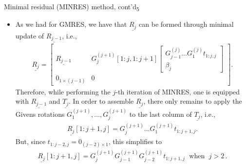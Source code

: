 \documentclass[t,usepdftitle=false]{beamer}
\begin{document}
\begin{frame}{Minimal residual (MINRES) method, cont'd\textsubscript{5}}
\begin{itemize}
\item[]As we had for GMRES, we have that $\underline{R_{j}}$ can be formed through minimal update of $\underline{R_{j-1}}$, i.e.,
\begin{align*}
\underline{R_j}
=\begin{bmatrix}
\underline{R_{j-1}}&G_j^{(j+1)}[1:j,1:j+1]\begin{bmatrix}G_{j-1}^{(j)}\dots G_1^{(j)}t_{1:j,j}\\\beta_{j}\end{bmatrix}\\
0_{1\times(j-1)}&0
\end{bmatrix}.
\end{align*}
Therefore, while performing the $j$-th iteration of MINRES, one is equipped with $\underline{R_{j-1}}$ and $\underline{T_j}$.
In order to assemble $\underline{R_j}$, there only remains to apply the Givens rotations $G_1^{(j+1)},\dots,G_j^{(j+1)}$ to the last column of $\underline{T_j}$, i.e.,\vspace{-.15cm}
\begin{align*}
\underline{R_j}[1:j+1,j]=G_j^{(j+1)}\dots G_1^{(j+1)}t_{1:j+1,j}.
\end{align*}
But, since $t_{1:j-2,j}=0_{(j-2)\times 1}$, this simplifies to
\begin{align*}
\boxed{\underline{R_j}[1:j+1,j]=G_j^{(j+1)}G_{j-1}^{(j+1)}G_{j-2}^{(j+1)}t_{1:j+1,j}
\;\text{ when }\;
j>2}\,.
\end{align*}
\end{itemize}
\end{frame}
\end{document}

